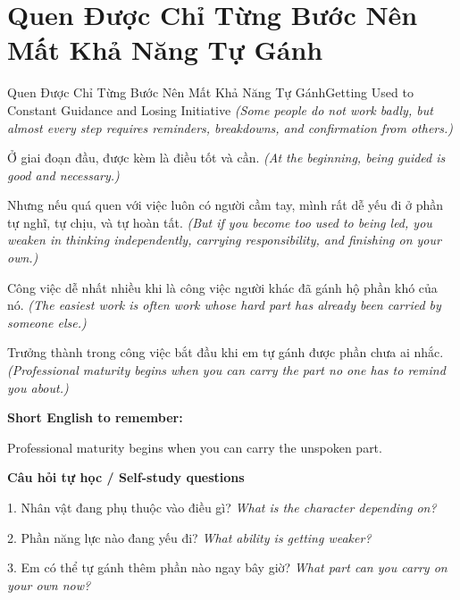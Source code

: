 \section{Quen Được Chỉ Từng Bước Nên Mất Khả Năng Tự Gánh}
\begin{truyen}{Quen Được Chỉ Từng Bước Nên Mất Khả Năng Tự Gánh}{Getting Used to Constant Guidance and Losing Initiative}
\textit{(Some people do not work badly, but almost every step requires reminders, breakdowns, and confirmation from others.)}

Ở giai đoạn đầu, được kèm là điều tốt và cần.
\textit{(At the beginning, being guided is good and necessary.)}

Nhưng nếu quá quen với việc luôn có người cầm tay, mình rất dễ yếu đi ở phần tự nghĩ, tự chịu, và tự hoàn tất.
\textit{(But if you become too used to being led, you weaken in thinking independently, carrying responsibility, and finishing on your own.)}

Công việc dễ nhất nhiều khi là công việc người khác đã gánh hộ phần khó của nó.
\textit{(The easiest work is often work whose hard part has already been carried by someone else.)}

\end{truyen}

\begin{baihoc}
Trưởng thành trong công việc bắt đầu khi em tự gánh được phần chưa ai nhắc.
\textit{(Professional maturity begins when you can carry the part no one has to remind you about.)}
\end{baihoc}

\begin{ghinhoanh}
\textbf{Short English to remember:}

Professional maturity begins when you can carry the unspoken part.

\end{ghinhoanh}

\begin{tuhocnhanh}
\textbf{Câu hỏi tự học / Self-study questions}

1. Nhân vật đang phụ thuộc vào điều gì? \textit{What is the character depending on?}

2. Phần năng lực nào đang yếu đi? \textit{What ability is getting weaker?}

3. Em có thể tự gánh thêm phần nào ngay bây giờ? \textit{What part can you carry on your own now?}
\end{tuhocnhanh}
\ngancach

